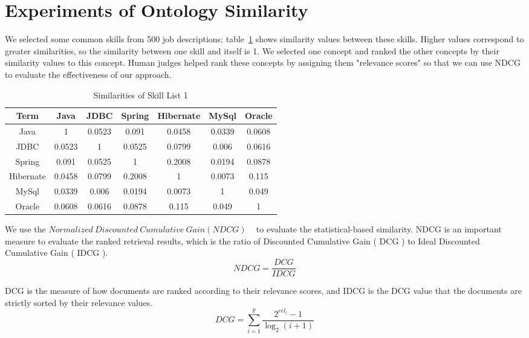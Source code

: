 \section{Experiments of Ontology Similarity}

We selected some common skills from 500 job descriptions; table~\ref{tab:dismatrix3} shows similarity values between these skills. Higher values correspond to greater similarities, so the similarity between one skill and itself is 1. We selected one concept and ranked the other concepts by their similarity values to this concept. Human judges helped rank these concepts by assigning them "relevance scores" so that we can use NDCG to evaluate the effectiveness of our approach.

\begin{table}

\caption{Similarities of Skill List 1}
\begin{tabular}{ c | c c c c c c   }
 \hline
  Term       &  Java  &  JDBC  & Spring & Hibernate & MySql  & Oracle   \\  \hline
  Java   &   1    & 0.0523 & 0.091  &   0.0458  & 0.0339 & 0.0608    \\  \hline
    JDBC   & 0.0523 &   1    & 0.0525 &   0.0799  & 0.006  & 0.0616   \\  \hline
   Spring  & 0.091  & 0.0525 &   1    &   0.2008  & 0.0194 & 0.0878   \\  \hline
 Hibernate & 0.0458 & 0.0799 & 0.2008 &     1     & 0.0073 & 0.115    \\  \hline
   MySql   & 0.0339 & 0.006  & 0.0194 &   0.0073  &   1    & 0.049    \\  \hline
   Oracle  & 0.0608 & 0.0616 & 0.0878 &   0.115   & 0.049  &   1      \\  \hline

\end{tabular}
\label{tab:dismatrix3}
\end{table}

We use the $ Normalized~Discounted~Cumulative~Gain ( NDCG )$ ~\cite{manning2008introduction} to evaluate the statistical-based similarity. NDCG is an important measure to evaluate the ranked retrieval results, which is the ratio of  Discounted Cumulative Gain ( DCG ) to Ideal Discounted Cumulative Gain ( IDCG ).
 $$ NDCG = \frac {DCG}{IDCG} $$

DCG is the measure of how documents are ranked according to their relevance scores, and IDCG is the DCG value that the documents are strictly sorted by their relevance values.
$$DCG =  \sum_{i=1}^{p} \frac {2^{rel_i} - 1}{\log_2(i+1)} $$


